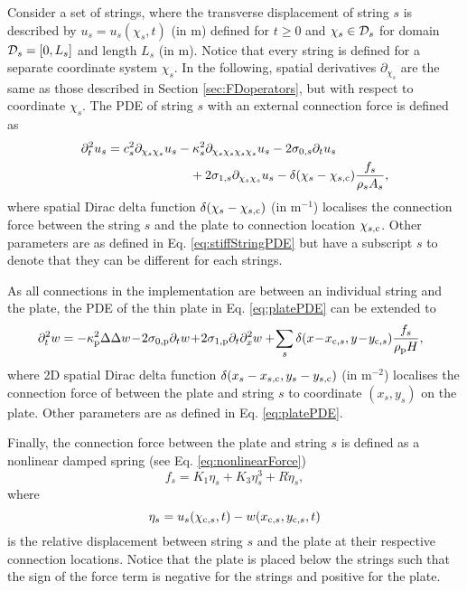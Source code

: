 Consider a set of strings, where the transverse displacement of string $s$ is described by $u_s = u_s(\chi_s, t)$ (in m) defined for $t\geq 0$ and $\chi_s \in \mathcal{D}_s$ for domain $\mathcal{D}_s = [0, L_s]$ and length $L_s$ (in m). Notice that every string is defined for a separate coordinate system $\chi_s$. In the following, spatial derivatives $\partial_{\chi_s}$ are the same as those described in Section \ref{sec:FDoperators}, but with respect to coordinate $\chi_s$. The PDE of string $s$ with an external connection force is defined as %
\begin{equation}
    \begin{aligned}
    \ptt u_s = c_s^2 \partial_{\chi_s\chi_s} u_s &- \kappa_s^2 \partial_{\chi_s\chi_s\chi_s\chi_s} u_s - 2 \szX[s]\pt u_s\\
    &\quad + 2 \soX[s] \partial_{\chi_s\chi_s} u_s - \delta(\chi_s - \chi_{s, \ctxt})\frac{f_s}{\rho_sA_s},
    \end{aligned}
\end{equation}
where spatial Dirac delta function $\delta(\chi_s - \chi_{s,\text{c}})$ (in m$^{-1}$) localises the connection force between the string $s$ and the plate to connection location $\chi_{s, \text{c}}$. Other parameters are as defined in Eq. \eqref{eq:stiffStringPDE} but have a subscript $s$ to denote that they can be different for each strings. 

As all connections in the implementation are between an individual string and the plate, the PDE of the thin plate in Eq. \eqref{eq:platePDE} can be extended to 
\begin{equation}
    \begin{aligned}
    \!\!\!\!\ptt w = -\kappa_\ptxt^2\Delta\Delta w &\!-\! 2\szX[\ptxt]\pt w\! +\! 2\soX[\ptxt] \pt\pxx w+ \!\sum_s\delta(x \!-\! x_{\ctxt,s}, y \!-\! y_{\ctxt,s})\frac{f_s}{\rho_\ptxt H},\!\!\!\!\!\!
    \end{aligned}
\end{equation}
where 2D spatial Dirac delta function $\delta(x_s - x_{s,\text{c}}, y_s - y_{s,\text{c}})$ (in m$^{-2}$) localises the connection force of between the plate and string $s$ to coordinate $(x_s, y_s)$ on the plate. Other parameters are as defined in Eq. \eqref{eq:platePDE}. 

Finally, the connection force between the plate and string $s$ is defined as a nonlinear damped spring (see Eq. \ref{eq:nonlinearForce})
\begin{equation}
    f_s = K_1\eta_s + K_3\eta_s^3 + R \dot \eta_s,
\end{equation}
where
\begin{equation}
    \eta_s = u_s(\chi_{\text{c},s}, t) - w(x_{\text{c},s}, y_{\text{c},s}, t)
\end{equation}
is the relative displacement between string $s$ and the plate at their respective connection locations. Notice that the plate is placed below the strings such that the sign of the force term is negative for the strings and positive for the plate.

